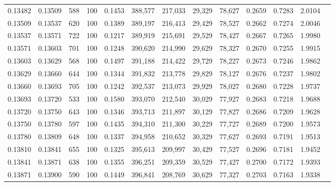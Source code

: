 \begin{tabular}{rrrrrrrrrrrrr}
0.13482 & 0.13509 &   588 & 100 &                                     0.1453 & 388,577 & 217,033 &  29,329 &  78,627 & 0.2659 & 0.7283 & 2.0104 \\
0.13509 & 0.13537 &   620 & 100 &                                     0.1389 & 389,197 & 216,413 &  29,429 &  78,527 & 0.2662 & 0.7274 & 2.0046 \\
0.13537 & 0.13571 &   722 & 100 &                                     0.1217 & 389,919 & 215,691 &  29,529 &  78,427 & 0.2667 & 0.7265 & 1.9980 \\
0.13571 & 0.13603 &   701 & 100 &                                     0.1248 & 390,620 & 214,990 &  29,629 &  78,327 & 0.2670 & 0.7255 & 1.9915 \\
0.13603 & 0.13629 &   568 & 100 &                                     0.1497 & 391,188 & 214,422 &  29,729 &  78,227 & 0.2673 & 0.7246 & 1.9862 \\
0.13629 & 0.13660 &   644 & 100 &                                     0.1344 & 391,832 & 213,778 &  29,829 &  78,127 & 0.2676 & 0.7237 & 1.9802 \\
0.13660 & 0.13693 &   705 & 100 &                                     0.1242 & 392,537 & 213,073 &  29,929 &  78,027 & 0.2680 & 0.7228 & 1.9737 \\
0.13693 & 0.13720 &   533 & 100 &                                     0.1580 & 393,070 & 212,540 &  30,029 &  77,927 & 0.2683 & 0.7218 & 1.9688 \\
0.13720 & 0.13750 &   643 & 100 &                                     0.1346 & 393,713 & 211,897 &  30,129 &  77,827 & 0.2686 & 0.7209 & 1.9628 \\
0.13750 & 0.13780 &   597 & 100 &                                     0.1435 & 394,310 & 211,300 &  30,229 &  77,727 & 0.2689 & 0.7200 & 1.9573 \\
0.13780 & 0.13809 &   648 & 100 &                                     0.1337 & 394,958 & 210,652 &  30,329 &  77,627 & 0.2693 & 0.7191 & 1.9513 \\
0.13810 & 0.13841 &   655 & 100 &                                     0.1325 & 395,613 & 209,997 &  30,429 &  77,527 & 0.2696 & 0.7181 & 1.9452 \\
0.13841 & 0.13871 &   638 & 100 &                                     0.1355 & 396,251 & 209,359 &  30,529 &  77,427 & 0.2700 & 0.7172 & 1.9393 \\
0.13871 & 0.13900 &   590 & 100 &                                     0.1449 & 396,841 & 208,769 &  30,629 &  77,327 & 0.2703 & 0.7163 & 1.9338 \\

\end{tabular}
